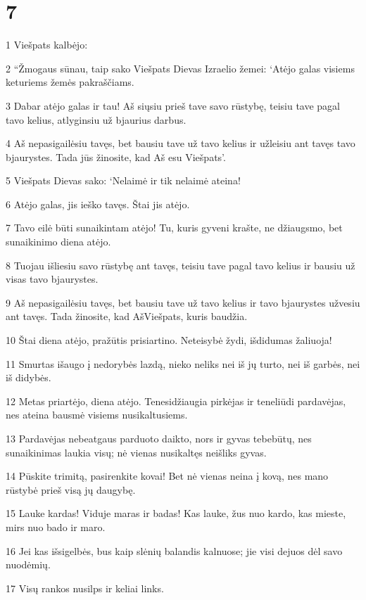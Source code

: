 \chapter{7}


\par 1 Viešpats kalbėjo: 
\par 2 “Žmogaus sūnau, taip sako Viešpats Dievas Izraelio žemei: ‘Atėjo galas visiems keturiems žemės pakraščiams. 
\par 3 Dabar atėjo galas ir tau! Aš siųsiu prieš tave savo rūstybę, teisiu tave pagal tavo kelius, atlyginsiu už bjaurius darbus. 
\par 4 Aš nepasigailėsiu tavęs, bet bausiu tave už tavo kelius ir užleisiu ant tavęs tavo bjaurystes. Tada jūs žinosite, kad Aš esu Viešpats’. 
\par 5 Viešpats Dievas sako: ‘Nelaimė ir tik nelaimė ateina! 
\par 6 Atėjo galas, jis ieško tavęs. Štai jis atėjo. 
\par 7 Tavo eilė būti sunaikintam atėjo! Tu, kuris gyveni krašte, ne džiaugsmo, bet sunaikinimo diena atėjo. 
\par 8 Tuojau išliesiu savo rūstybę ant tavęs, teisiu tave pagal tavo kelius ir bausiu už visas tavo bjaurystes. 
\par 9 Aš nepasigailėsiu tavęs, bet bausiu tave už tavo kelius ir tavo bjaurystes užvesiu ant tavęs. Tada žinosite, kad Aš­Viešpats, kuris baudžia. 
\par 10 Štai diena atėjo, pražūtis prisiartino. Neteisybė žydi, išdidumas žaliuoja! 
\par 11 Smurtas išaugo į nedorybės lazdą, nieko neliks nei iš jų turto, nei iš garbės, nei iš didybės. 
\par 12 Metas priartėjo, diena atėjo. Tenesidžiaugia pirkėjas ir teneliūdi pardavėjas, nes ateina bausmė visiems nusikaltusiems. 
\par 13 Pardavėjas nebeatgaus parduoto daikto, nors ir gyvas tebebūtų, nes sunaikinimas laukia visų; nė vienas nusikaltęs neišliks gyvas. 
\par 14 Pūskite trimitą, pasirenkite kovai! Bet nė vienas neina į kovą, nes mano rūstybė prieš visą jų daugybę. 
\par 15 Lauke kardas! Viduje maras ir badas! Kas lauke, žus nuo kardo, kas mieste, mirs nuo bado ir maro. 
\par 16 Jei kas išsigelbės, bus kaip slėnių balandis kalnuose; jie visi dejuos dėl savo nuodėmių. 
\par 17 Visų rankos nusilps ir keliai links. 
